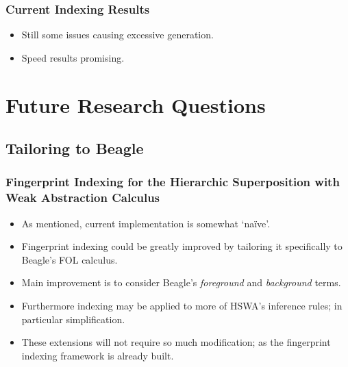 \documentclass[10pt]{beamer}
\begin{document}
\begin{NoHyper}
\begin{frame}
\begin{itemize}
  \end{itemize}
\end{frame}
\begin{frame}
  \frametitle{Current Indexing Results}
  \begin{itemize}
  \item<1-> Still some issues causing excessive generation.
  \item<2-> Speed results promising.

  \end{itemize}
\end{frame}

\section{Future Research Questions}

\subsection{Tailoring to Beagle}
\begin{frame}
  \frametitle{Fingerprint Indexing for the Hierarchic Superposition with Weak Abstraction Calculus}
  \begin{itemize}
  \item<1-> As mentioned, current implementation is somewhat `na\"{i}ve'.
  \item<2-> Fingerprint indexing could be greatly improved by tailoring it specifically
  to Beagle's FOL calculus.
  \item<2-> Main improvement is to consider Beagle's \emph{foreground} and \emph{background}
  terms.
  \item<3-> Furthermore indexing may be applied to more
  of HSWA's inference rules; in particular simplification.
  \item<4-> These extensions will not require so much modification; as the fingerprint
  indexing framework is already built.
  \end{itemize}
\end{frame}


\end{NoHyper}
\end{document}
